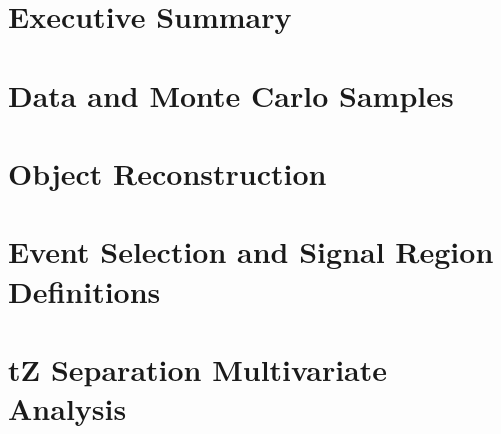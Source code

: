 \documentclass[NOTE, atlasdraft=true, texlive=2016, UKenglish]{\ATLASLATEXPATH atlasdoc}
\begin{document}
\clearpage

\section{Executive Summary}
\label{sec:summary}


%

\section{Data and Monte Carlo Samples}
\label{sec:data}


\section{Object Reconstruction}
\label{sec:obj}


\section{Event Selection and Signal Region Definitions}
\label{sec:evt_selection}


\section{tZ Separation Multivariate Analysis}
\label{sec:tZ_bdt}

\end{document}
